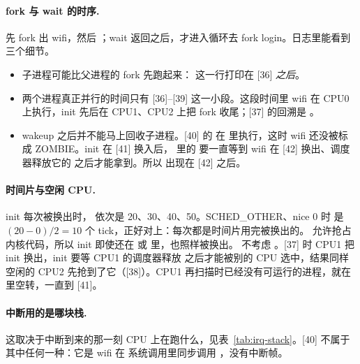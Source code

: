 \paragraph{fork 与 wait 的时序.}  先 fork 出 wifi，然后 ；wait 返回之后，才进入循环去 fork login。日志里能看到三个细节。
\begin{itemize}
  \item 子进程可能比父进程的 fork 先跑起来： 这一行打印在 [36] \emph{之后}。
  \item 两个进程真正并行的时间只有 [36]--[39] 这一小段。这段时间里 wifi 在 CPU0 上执行，init 先后在 CPU1、CPU2 上把 fork 收尾；[37] 的回溯是 。
  \item wakeup 之后并不能马上回收子进程。[40] 的  在  里执行，这时 wifi 还没被标成 ZOMBIE。init 在 [41] 换入后， 里的  要一直等到 wifi 在 [42] 换出、调度器释放它的  之后才能拿到。所以  出现在 [42] 之后。
\end{itemize}

\paragraph{时间片与空闲 CPU.} init 每次被换出时， 依次是 20、30、40、50。SCHED\_OTHER、nice 0 时  是 $(20-0)/2=10$ 个 tick，正好对上：每次都是时间片用完被换出的。 允许抢占内核代码，所以 init 即使还在  或  里，也照样被换出。 不考虑 。[37] 时 CPU1 把 init 换出，init 要等 CPU1 的调度器释放  之后才能被别的 CPU 选中，结果同样空闲的 CPU2 先抢到了它（[38]）。CPU1 再扫描时已经没有可运行的进程，就在  里空转，一直到 [41]。

\paragraph{中断用的是哪块栈.} 这取决于中断到来的那一刻 CPU 上在跑什么，见表~\ref{tab:irq-stack}。[40] 不属于其中任何一种：它是 wifi 在  系统调用里同步调用 ，没有中断帧。

